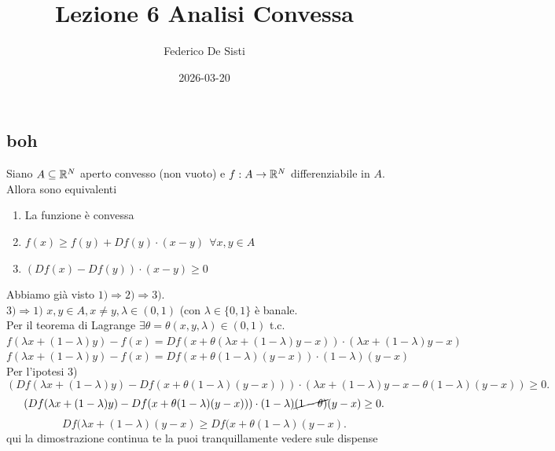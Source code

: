 \documentclass[12px]{article}
\title{Lezione 6 Analisi Convessa}
\date{2026-03-20}
\author{Federico De Sisti}
\begin{document}
	\maketitle
	\newpage
	\subsection{boh}
	\begin{prop}
		Siano $A\subseteq\mathbb{R}^N$ aperto convesso (non vuoto) e  $f:A \rightarrow \mathbb{R}^N$ differenziabile in $A$.\\
		Allora sono equivalenti
		\begin{enumerate}
			\item La funzione è convessa
			\item $f(x)\geq f(y) + Df(y)\cdot (x-y) \ \ \forall x,y\in A$
			\item $(Df(x)-Df(y))\cdot (x-y) \geq 0$
		\end{enumerate}
	\end{prop}
	\begin{dimo}
			Abbiamo già visto $1)  \Rightarrow  2) \Rightarrow  3)$.\\
			$3) \Rightarrow  1)$ $x,y\in A, x\neq y, \lambda\in (0,1)$ (con $\lambda \in\{0,1\}$ è banale.\\
			Per il teorema di Lagrange $\exists \theta = \theta(x,y, \lambda)\in(0,1)$  t.c.\\
			$f( \lambda x + (1 - \lambda)y) - f(x) = Df(x + \theta( \lambda x + (1 - \lambda)y - x))\cdot ( \lambda x + (1 - \lambda)y - x)$\\
			$f( \lambda x + (1 - \lambda) y ) - f(x) = Df(x + \theta( 1 - \lambda) (y - x))\cdot (1 - \lambda)(y-x)$\\
			Per l'ipotesi 3)
			\[
				(Df( \lambda x + (1 - \lambda) y) - Df (x + \theta (1 - \lambda)(y - x)))\cdot ( \lambda x + (1 - \lambda) y - x - \theta ( 1 - \lambda)(y - x)) \geq 0
			.\] 
			\[
				(Df( \lambda x + (1 - \lambda) y) - Df (x + \theta (1 - \lambda)(y - x)))\cdot ( 1 - \lambda) \cancel{(1 - \theta)} (y - x)\geq 0
			.\] 
			\[
			D f ( \lambda x + (1 - \lambda)(y-x)\geq D f(x + \theta ( 1- \lambda)(y-x)
			.\] 
			qui la dimostrazione continua te la puoi tranquillamente vedere sule dispense

	\end{dimo}
\end{document}
